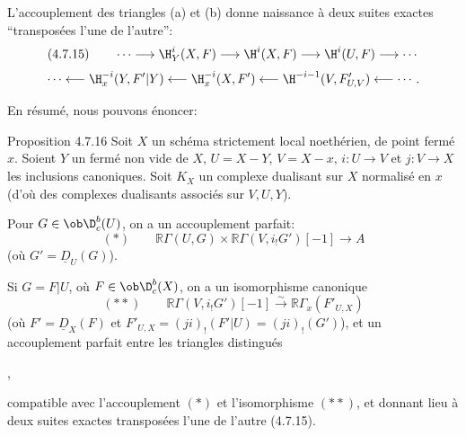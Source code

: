 L'accouplement des triangles (a) et (b) donne naissance à deux suites exactes ``transposées l'une de l'autre'':
\[
(4.7.15)\qquad \cdots\longrightarrow \H_Y^i(X,F)\longrightarrow\H^i(X,F)\longrightarrow\H^i(U,F)\longrightarrow\cdots
\]
\[
\cdots\longleftarrow \H_x^{-i}(Y,F'|Y)\longleftarrow\H_x^{-i}(X,F')\longleftarrow\H^{-i-1}(V,F'_{U,V})\longleftarrow\cdots.
\]

En résumé, nous pouvons énoncer:

\begin{statement}{Proposition 4.7.16}
Soit $X$ un schéma strictement local noethérien, de point fermé $x$. Soient $Y$ un fermé non vide de $X$, $U=X-Y$, $V=X-x$, $i:U\to V$ et $j:V\to X$ les inclusions canoniques. Soit $K_X$ un complexe dualisant sur $X$ normalisé en $x$ (d'où des complexes dualisants associés sur $V,U,Y$).

Pour $G\in\ob\D_c^b(U)$, on a un accouplement parfait:
\[
(*)\qquad \mathbb{R}\Gamma(U,G)\times\mathbb{R}\Gamma(V,i_!G')[-1]\longrightarrow A
\]
(où $G'=\underline{D}_U(G)$).

Si $G=F|U$, où $F\in\ob\D_c^b(X)$, on a un isomorphisme canonique
\[
(**)\qquad \mathbb{R}\Gamma(V,i_!G')[-1]\xrightarrow{\sim}\mathbb{R}\Gamma_x(F'_{U,X})
\]
(où $F'=\underline{D}_X(F)$ et $F'_{U,X}=(ji)_!(F'|U)=(ji)_!(G')$), et un accouplement parfait entre les triangles distingués
\begin{center}
\quad ,
\end{center}
compatible avec l'accouplement $(*)$ et l'isomorphisme $(**)$, et donnant lieu à deux suites exactes transposées l'une de l'autre (4.7.15).
\end{statement}

